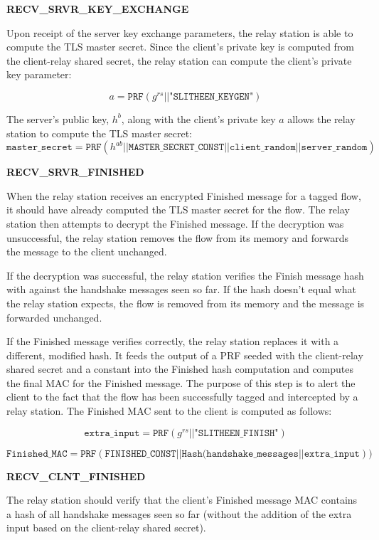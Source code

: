 \documentclass[11pt]{article}
\theoremstyle{definittion}
\begin{document}
\textbf{RECV\_SRVR\_KEY\_EXCHANGE}

Upon receipt of the server key exchange parameters, the relay station is able to compute the TLS master secret. Since the client's private key is computed from the client-relay shared secret, the relay station can compute the client's private key parameter:

$$a = \texttt{PRF}(g^{rs} || \texttt{"SLITHEEN\_KEYGEN"})$$

The server's public key, $h^b$, along with the client's private key $a$ allows the relay station to compute the TLS master secret:
$$\texttt{master\_secret} = \texttt{PRF} (h^{ab} || \texttt{MASTER\_SECRET\_CONST} || \texttt{client\_random} || \texttt{server\_random})$$

\textbf{RECV\_SRVR\_FINISHED}

When the relay station receives an encrypted Finished message for a tagged flow, it should have already computed the TLS master secret for the flow.
The relay station then attempts to decrypt the Finished message.
If the decryption was unsuccessful, the relay station removes the flow from its memory and forwards the message to the client unchanged.

If the decryption was successful, the relay station verifies the Finish message hash with against the handshake messages seen so far. If the hash doesn't equal what the relay station expects, the flow is removed from its memory and the message is forwarded unchanged.

If the Finished message verifies correctly, the relay station replaces it with a different, modified hash. It feeds the output of a PRF seeded with the client-relay shared secret and a constant into the Finished hash computation and computes the final MAC for the Finished message. The purpose of this step is to alert the client to the fact that the flow has been successfully tagged and intercepted by a relay station. The Finished MAC sent to the client is computed as follows:

$$\texttt{extra\_input} = \texttt{PRF}(g^{rs} || \texttt{"SLITHEEN\_FINISH"})$$

$$\texttt{Finished\_MAC} = \texttt{PRF}(\texttt{FINISHED\_CONST}||\texttt{Hash(handshake\_messages} || \texttt{extra\_input}))$$

\textbf{RECV\_CLNT\_FINISHED}

The relay station should verify that the client's Finished message MAC contains a hash of all handshake messages seen so far (without the addition of the extra input based on the client-relay shared secret).
\end{document}
